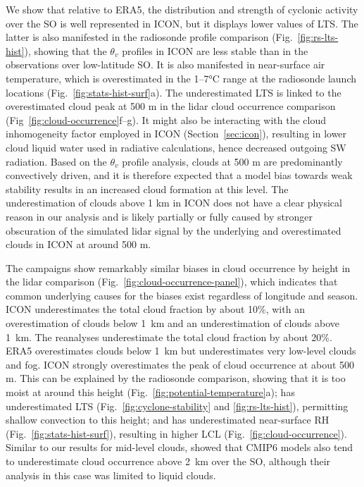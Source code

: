 \documentclass[draft]{agujournal2019}
\begin{document}
We show that relative to ERA5, the distribution and strength of cyclonic activity over the SO is well represented in ICON, but it displays lower values of LTS. The latter is also manifested in the radiosonde profile comparison (Fig.~\ref{fig:rs-lts-hist}), showing that the $\theta_v$ profiles in ICON are less stable than in the observations over low-latitude SO. It is also manifested in near-surface air temperature, which is overestimated in the 1--7°C range at the radiosonde launch locations (Fig.~\ref{fig:stats-hist-surf}a). The underestimated LTS is linked to the overestimated cloud peak at 500 m in the lidar cloud occurrence comparison (Fig~\ref{fig:cloud-occurrence}f--g). It might also be interacting with the cloud inhomogeneity factor employed in ICON (Section~\ref{sec:icon}), resulting in lower cloud liquid water used in radiative calculations, hence decreased outgoing SW radiation. Based on the $\theta_v$ profile analysis, clouds at 500 m are predominantly convectively driven, and it is therefore expected that a model bias towards weak stability results in an increased cloud formation at this level. The underestimation of clouds above 1 km in ICON does not have a clear physical reason in our analysis and is likely partially or fully caused by stronger obscuration of the simulated lidar signal by the underlying and overestimated clouds in ICON at around 500 m.

The campaigns show remarkably similar biases in cloud occurrence by height in the lidar comparison (Fig.~\ref{fig:cloud-occurrence-panel}), which indicates that common underlying causes for the biases exist regardless of longitude and season. ICON underestimates the total cloud fraction by about 10\%, with an overestimation of clouds below 1~km and an underestimation of clouds above 1~km. The reanalyses underestimate the total cloud fraction by about 20\%. ERA5 overestimates clouds below 1~km but underestimates very low-level clouds and fog. ICON strongly overestimates the peak of cloud occurrence at about 500 m. This can be explained by the radiosonde comparison, showing that it is too moist at around this height (Fig.~\ref{fig:potential-temperature}a); has underestimated LTS (Fig.~\ref{fig:cyclone-stability} and \ref{fig:rs-lts-hist}), permitting shallow convection to this height; and has underestimated near-surface RH (Fig.~\ref{fig:stats-hist-surf}), resulting in higher LCL (Fig.~\ref{fig:cloud-occurrence}). Similar to our results for mid-level clouds,  showed that CMIP6 models also tend to underestimate cloud occurrence above 2~km over the SO, although their analysis in this case was limited to liquid clouds.
\end{document}
